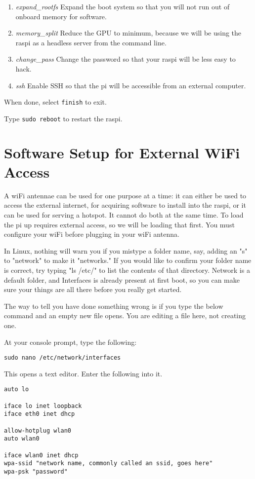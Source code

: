 \begin{enumerate}
\item \textit{expand\_rootfs} Expand the boot system so that you will not run out of onboard memory for software.
\item \textit{memory\_split} Reduce the GPU to minimum, because we will be using the raspi as a headless server from the command line.
\item \textit{change\_pass} Change the password so that your raspi will be less easy to hack.
\item \textit{ssh} Enable SSH so that the pi will be accessible from an external computer.
\end{enumerate}

When done, select \texttt{finish} to exit. 

Type \texttt{sudo reboot} to restart the raspi.

\section{Software Setup for External WiFi Access}

A wiFi antennae can be used for one purpose at a time: it can either be used to access the external internet, for acquiring software to install into the raspi, or it can be used for serving a hotspot. It cannot do both at the same time. To load the pi up requires external access, so we will be loading that first. You must configure your wiFi before plugging in your wiFi antenna.

In Linux, nothing will warn you if you mistype a folder name, say, adding an "s" to "network" to make it "networks." If you would like to confirm your folder name is correct, try typing "ls /etc/" to list the contents of that directory. Network is a default folder, and Interfaces is already present at first boot, so you can make sure your things are all there before you really get started.

The way to tell you have done something wrong is if you type the below command and an empty new file opens. You are editing a file here, not creating one.

At your console prompt, type the following: 
\begin{lstlisting}
sudo nano /etc/network/interfaces
\end{lstlisting}

This opens a text editor. Enter the following into it.

\begin{lstlisting}
auto lo

iface lo inet loopback
iface eth0 inet dhcp

allow-hotplug wlan0
auto wlan0

iface wlan0 inet dhcp
wpa-ssid "network name, commonly called an ssid, goes here"
wpa-psk "password"
\end{lstlisting}

